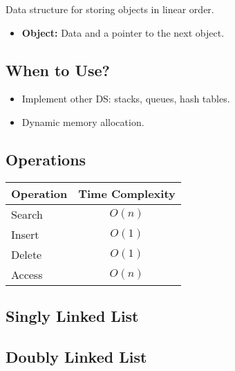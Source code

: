 \begin{summary}
    Data structure for storing objects in linear order. 
    \begin{itemize}
        \item \textbf{Object:} Data and a pointer to the next object. 
    \end{itemize}    
\end{summary}

\subsection{When to Use?}
\begin{summary}
    \begin{itemize}
        \item Implement other DS: stacks, queues, hash tables. 
        \item Dynamic memory allocation. 
    \end{itemize}
\end{summary}

\subsection{Operations}
\begin{summary}
    \begin{center}
        \begin{tabular}{lc}
            \toprule
            \textbf{Operation} & \textbf{Time Complexity} \\
            \midrule
            Search & $O(n)$ \\
            Insert & $O(1)$ \\
            Delete & $O(1)$ \\
            Access & $O(n)$ \\
            \bottomrule
        \end{tabular}
    \end{center}
\end{summary}

\subsection{Singly Linked List}
\begin{algo}
    
\end{algo}

\subsection{Doubly Linked List}
\begin{algo}

\end{algo}

